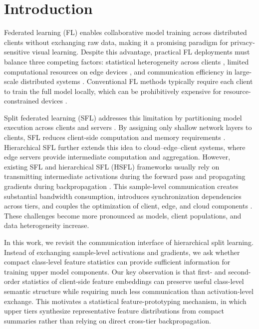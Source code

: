\section{Introduction}\label{sec:intro}

Federated learning (FL) \cite{pmlr-v54-mcmahan17a} enables collaborative model training across distributed clients without exchanging raw data, making it a promising paradigm for privacy-sensitive visual learning. Despite this advantage, practical FL deployments must balance three competing factors: statistical heterogeneity across clients \cite{tan2022fedproto,10660707,nguyen2026towards}, limited computational resources on edge devices \cite{MAL-083,11180918}, and communication efficiency in large-scale distributed systems \cite{nguyen2022hcfl,nguyen2025federated}. Conventional FL methods typically require each client to train the full model locally, which can be prohibitively expensive for resource-constrained devices \cite{9760729,9084352,dai2023tacklingFedProx}.

Split federated learning (SFL) addresses this limitation by partitioning model execution across clients and servers \cite{thapa2022splitfed}. By assigning only shallow network layers to clients, SFL reduces client-side computation and memory requirements \cite{GUPTA20181,vepakomma2019split}. Hierarchical SFL further extends this idea to cloud--edge--client systems, where edge servers provide intermediate computation and aggregation. However, existing SFL and hierarchical SFL (HSFL) frameworks usually rely on transmitting intermediate activations during the forward pass and propagating gradients during backpropagation \cite{11091500,zhang2025amperecommunicationefficienthighaccuracysplit,qiu2023evaluating,wang2025towards}. This sample-level communication creates substantial bandwidth consumption, introduces synchronization dependencies across tiers, and couples the optimization of client, edge, and cloud components \cite{10980018,quan2023hiersfl}. These challenges become more pronounced as models, client populations, and data heterogeneity increase.

In this work, we revisit the communication interface of hierarchical split learning. Instead of exchanging sample-level activations and gradients, we ask whether compact class-level feature statistics can provide sufficient information for training upper model components. Our key observation is that first- and second-order statistics of client-side feature embeddings can preserve useful class-level semantic structure while requiring much less communication than activation-level exchange. This motivates a statistical feature-prototyping mechanism, in which upper tiers synthesize representative feature distributions from compact summaries rather than relying on direct cross-tier backpropagation.

